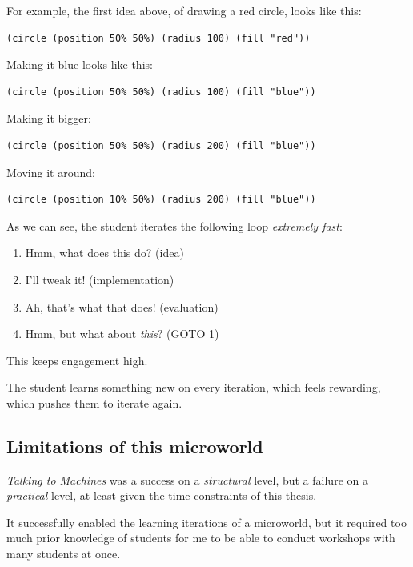 For example, the first idea above, of drawing a red circle, looks like
this: 

\begin{verbatim}
(circle (position 50% 50%) (radius 100) (fill "red"))
\end{verbatim}

Making it blue looks like this:

\begin{verbatim}
(circle (position 50% 50%) (radius 100) (fill "blue"))
\end{verbatim}

Making it bigger:

\begin{verbatim}
(circle (position 50% 50%) (radius 200) (fill "blue"))
\end{verbatim}

Moving it around: 

\begin{verbatim}
(circle (position 10% 50%) (radius 200) (fill "blue"))
\end{verbatim}

As we can see, the student iterates the following loop \emph{extremely fast}: 

\begin{enumerate}
\item Hmm, what does this do? (idea) 
\item I'll tweak it! (implementation) 
\item Ah, that's what that does! (evaluation) 
\item Hmm, but what about \emph{this}? (GOTO 1) 
\end{enumerate}

This keeps engagement high.

The student learns something new on every iteration, which feels rewarding,
which pushes them to iterate again.

\subsection{Limitations of this microworld}

\emph{Talking to Machines} was a success on a \emph{structural} level,
but a failure on a \emph{practical} level, at least given the time
constraints of this thesis.

It successfully enabled the learning iterations of a microworld, but it
required too much prior knowledge of students for me to be able to
conduct workshops with many students at once.

